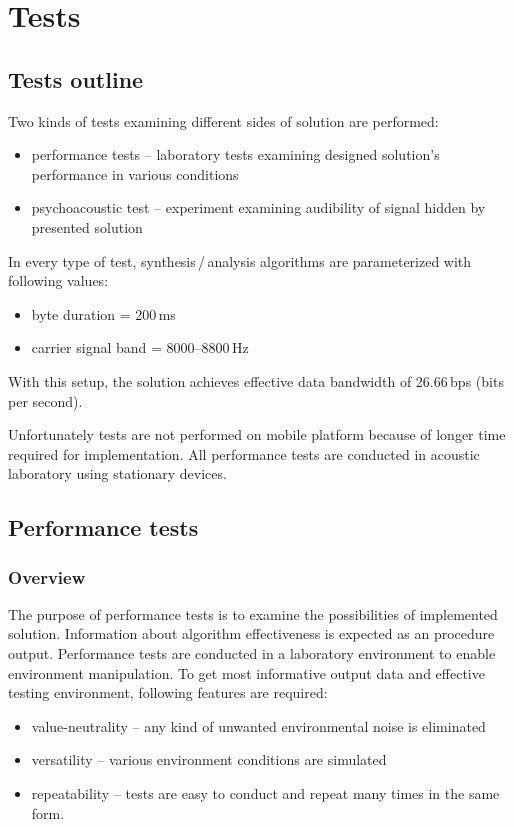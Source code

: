 \chapter{Tests}
\label{chap:tests}

\section{Tests outline}

Two kinds of tests examining different sides of solution are performed:
\begin{itemize}
  \item performance tests -- laboratory tests examining designed solution's performance in various conditions
  \item psychoacoustic test -- experiment examining audibility of signal hidden by presented solution
\end{itemize}

\noindent In every type of test, synthesis\,/\,analysis algorithms are parameterized with following values:

\begin{itemize}
  \item byte duration = 200\,ms
  \item carrier signal band = 8000--8800\,\mbox{Hz}
\end{itemize}

With this setup, the solution achieves effective data bandwidth of 26.66\,\mbox{bps} (bits per second).

Unfortunately tests are not performed on mobile platform because of longer time required for implementation. All performance tests 
are conducted in acoustic laboratory using stationary devices.

\section{Performance tests}
\subsection{Overview}
The purpose of performance tests is to examine the possibilities of implemented solution. Information about algorithm effectiveness is expected as an procedure output.
Performance tests are conducted in a laboratory environment to enable environment manipulation.
To get most informative output data and effective testing environment, following features are required:
\begin{itemize}
  \item value-neutrality -- any kind of unwanted environmental noise is eliminated
  \item versatility -- various environment conditions are simulated
  \item repeatability -- tests are easy to conduct and repeat many times in the same form.
\end{itemize}

